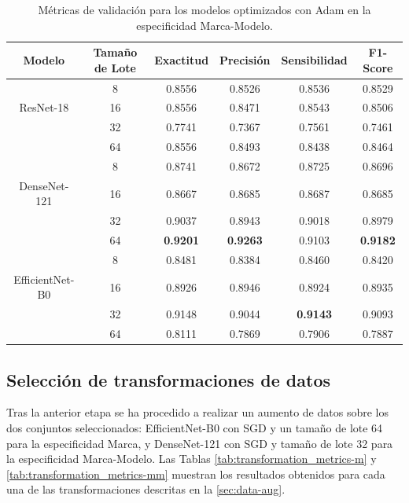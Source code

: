 \begin{table}[H]
	\centering
	\begin{adjustbox}{width=\textwidth}
		\begin{tabular}{|c|c|c|c|c|c|}
			\hline
			\textbf{Modelo} & \textbf{Tamaño de Lote} & \textbf{Exactitud} & \textbf{Precisión} & \textbf{Sensibilidad} & \textbf{F1-Score} \\
			\hline
			 & 8 & 0.8556 & 0.8526 & 0.8536 & 0.8529 \\ \cline{2-6}
			ResNet-18 & 16 & 0.8556 & 0.8471 & 0.8543 & 0.8506 \\ \cline{2-6}
			& 32 & 0.7741 & 0.7367 & 0.7561 & 0.7461 \\ \cline{2-6}
			& 64 & 0.8556 & 0.8493 & 0.8438 & 0.8464 \\
			\hline
			 & 8 & 0.8741 & 0.8672 & 0.8725 & 0.8696 \\ \cline{2-6}
			DenseNet-121 & 16 & 0.8667 & 0.8685 & 0.8687 & 0.8685 \\ \cline{2-6}
			 & 32 & 0.9037 & 0.8943 & 0.9018 & 0.8979 \\ \cline{2-6}
			 & 64 & \textbf{0.9201} & \textbf{0.9263} & 0.9103 & \textbf{0.9182} \\
			\hline
			 & 8 & 0.8481 & 0.8384 & 0.8460 & 0.8420 \\ \cline{2-6}
			EfficientNet-B0 & 16 & 0.8926 & 0.8946 & 0.8924 & 0.8935 \\ \cline{2-6}
			 & 32 & 0.9148 & 0.9044 & \textbf{0.9143} & 0.9093 \\ \cline{2-6}
			 & 64 & 0.8111 & 0.7869 & 0.7906 & 0.7887 \\
			\hline
		\end{tabular}
	\end{adjustbox}
	\caption{Métricas de validación para los modelos optimizados con Adam en la especificidad Marca-Modelo.}
	\label{tab:adam_metrics_mm}
\end{table}

\subsection{Selección de transformaciones de datos}

Tras la anterior etapa se ha procedido a realizar un aumento de datos sobre los dos conjuntos seleccionados: EfficientNet-B0 con SGD y un tamaño de lote 64 para la especificidad Marca, y DenseNet-121 con SGD y tamaño de lote 32 para la especificidad Marca-Modelo. Las Tablas \ref{tab:transformation_metrics-m} y \ref{tab:transformation_metrics-mm} muestran los resultados obtenidos para cada una de las transformaciones descritas en la \autoref{sec:data-aug}.

